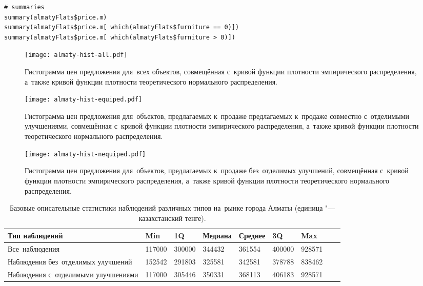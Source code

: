 \documentclass[]{scrreprt}
\begin{document}
%
\begin{lstlisting}[float, caption = Построение базовых описательных статистик для~наблюдений различных типов, firstnumber=1, label= lst:summaries-R]
# summaries
summary(almatyFlats$price.m)
summary(almatyFlats$price.m[ which(almatyFlats$furniture == 0)])
summary(almatyFlats$price.m[ which(almatyFlats$furniture > 0)])
\end{lstlisting}
%
\begin{figure}[ht]
	\centering
	\texttt{[image: almaty-hist-all.pdf]}
	\caption{Гистограмма цен предложения для~всех объектов, совмещённая с~кривой функции плотности эмпирического распределения, а~также кривой функции плотности теоретического нормального распределения.}
	\label{fig:almaty-hist-all-r}
\end{figure}
%
%
\begin{figure}[ht]
	\centering
	\texttt{[image: almaty-hist-equiped.pdf]}
	\caption{Гистограмма цен предложения для~объектов, предлагаемых к~продаже предлагаемых к~продаже совместно с~отделимыми улучшениями, совмещённая с~кривой функции плотности эмпирического распределения, а~также кривой функции плотности теоретического нормального распределения.}
	\label{fig:almaty-hist-equiped-r}
\end{figure}
%
%
\begin{figure}[ht]
	\centering
	\texttt{[image: almaty-hist-nequiped.pdf]}
	\caption{Гистограмма цен предложения для~объектов, предлагаемых к~продаже без~отделимых улучшений, совмещённая с~кривой функции плотности эмпирического распределения, а~также кривой функции плотности теоретического нормального распределения.}
	\label{fig:almaty-hist-nequiped-r}
\end{figure}
%
\begin{table}[ht]
	\caption{Базовые описательные статистики наблюдений различных типов на~рынке города Алматы (единица "--- казахстанский тенге).}\label{tab:summaries-almaty-R}
	\centering
	\begin{tabular}{lllllllll}
		\hline
		Тип наблюдений&Min&1Q&Медиана&Среднее&3Q&Max\\
		\hline
		Все~наблюдения&117000&300000&344432&361554&400000&928571\\
		\hline
		Наблюдения без~отделимых улучшений&152542&291803&325581&342581&378788&838462\\
		\hline
		Наблюдения с~отделимыми улучшениями&117000&305446&350331&368113&406183&928571\\
		\hline
	\end{tabular}
\end{table}
\end{document}
